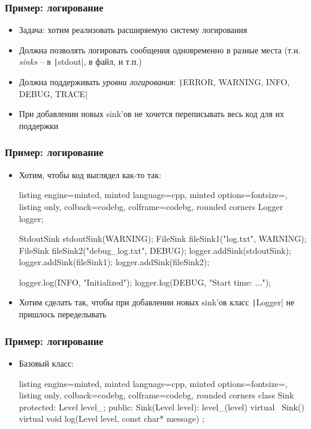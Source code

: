 \documentclass[10pt]{beamer}
\begin{document}
\begin{frame}[fragile]
\frametitle{Пример: логирование}
\begin{itemize}
\item Задача: хотим реализовать расширяемую систему логирования
\pause
\item Должна позволять логировать сообщения одновременно в разные места (т.н. \textit{sinks} -- в \texttt|stdout|, в файл, и т.п.)
\pause
\item Должна поддерживать \textit{уровни логирования}: \texttt|ERROR, WARNING, INFO, DEBUG, TRACE|
\pause
\item При добавлении новых sink'ов не хочется переписывать весь код для их поддержки
\end{itemize}
\end{frame}

\begin{frame}[fragile]
\frametitle{Пример: логирование}
\begin{itemize}
\item Хотим, чтобы код выглядел как-то так:
\begin{tcblisting}{listing engine=minted, minted language=cpp, minted options={fontsize=\scriptsize}, listing only, colback=codebg, colframe=codebg, rounded corners}
Logger logger;

StdoutSink stdoutSink(WARNING);
FileSink fileSink1("log.txt", WARNING);
FileSink fileSink2("debug_log.txt", DEBUG);
logger.addSink(stdoutSink);
logger.addSink(fileSink1);
logger.addSink(fileSink2);

logger.log(INFO, "Initialized");
logger.log(DEBUG, "Start time: ...");
\end{tcblisting}
\pause
{}
\item Хотим сделать так, чтобы при добавлении новых sink'ов класс \texttt|Logger| не пришлось переделывать
\end{itemize}
\end{frame}

\begin{frame}[fragile]
\frametitle{Пример: логирование}
\begin{itemize}
\item Базовый класс:
\begin{tcblisting}{listing engine=minted, minted language=cpp, minted options={fontsize=\scriptsize}, listing only, colback=codebg, colframe=codebg, rounded corners}
class Sink {
protected:
  Level level_;
public:
  Sink(Level level): level_(level) {}
  virtual ~Sink() {}
  virtual void log(Level level, const char* message) {}
};
\end{tcblisting}
\end{itemize}
\end{frame}
\end{document}
